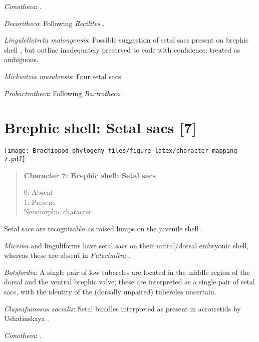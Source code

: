 \documentclass[openany]{book}
\theoremstyle{definition}
\theoremstyle{definition}
\theoremstyle{definition}
\theoremstyle{remark}
\begin{document}
\hypertarget{Conotheca-coding-6}{}
\emph{Conotheca}: \citep{Wrona2003}.

\hypertarget{Decoritheca-coding-6}{}
\emph{Decoritheca}: Following \emph{Recilites} \citep{Dzik1978}.

\hypertarget{Lingulellotreta_malongensis-coding-6}{}
\emph{Lingulellotreta malongensis}: Possible suggestion of setal sacs
present on brephic shell \citep{Holmer1997EarlyCambrian, Li2004}, but
outline inadequately preserved to code with confidence; treated as
ambiguous.

\hypertarget{Mickwitzia_muralensis-coding-6}{}
\emph{Mickwitzia muralensis}: Four setal sacs.

\hypertarget{Probactrotheca-coding-6}{}
\emph{Probactrotheca}: Following \emph{Bactrotheca}
\citep{Dzik1980Ontogenyof}.

\section{Brephic shell: Setal sacs
{[}7{]}}\label{brephic-shell-setal-sacs-7}

\texttt{[image: Brachiopod\_phylogeny\_files/figure-latex/character-mapping-7.pdf]}

\begin{quote}
\textbf{Character 7: Brephic shell: Setal sacs}

0: Absent\\
1: Present\\
Neomorphic character.
\end{quote}

Setal sacs are recognizable as raised lumps on the juvenile shell
\citep[see][]{Bassett2017Earliestontogeny}.

\emph{Micrina} and linguliforms have setal sacs on their mitral/dorsal
embryonic shell, whereas these are absent in \emph{Paterimitra}
\citep{Holmer2011Firstrecord}.

\hypertarget{Botsfordia-coding-7}{}
\emph{Botsfordia}: A single pair of low tubercles are \citep[ state
``may be'']{Ushatinskaya2016Revisionof} located in the middle region of
the dorsal and the ventral brephic valve; these are interpreted as a
single pair of setal sacs, with the identity of the (dorsally unpaired)
tubercles uncertain.

\hypertarget{Clupeafumosus_socialis-coding-7}{}
\emph{Clupeafumosus socialis}: Setal bundles interpreted as present in
acrotretids by Ushatinskaya \citeyearpar{Ushatinskaya2016Protegulumand}.

\hypertarget{Conotheca-coding-7}{}
\emph{Conotheca}: \citep{Wrona2003}.
\end{document}
